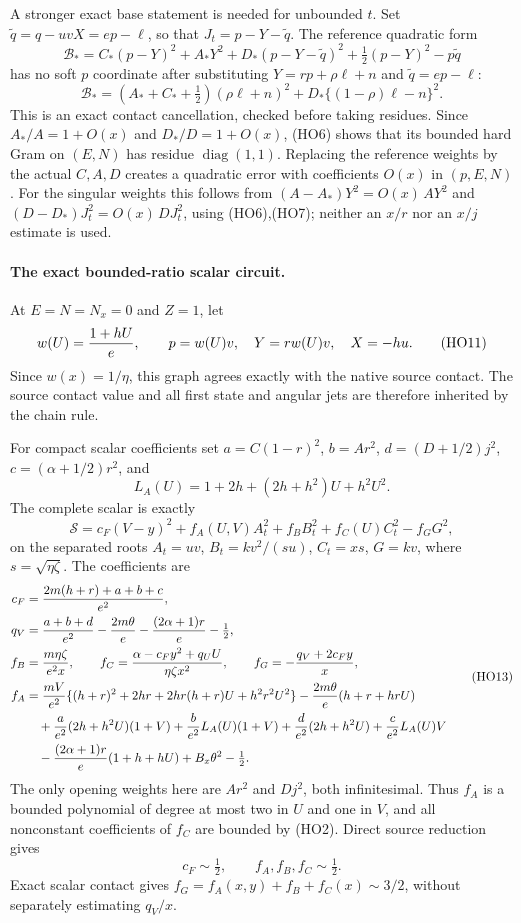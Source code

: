 A stronger exact base statement is needed for unbounded $t$.
Set $\widetilde q=q-uvX=ep-\ell$, so that
$J_t=p-Y-\widetilde q$. The reference quadratic form
\[
 \mathcal B_*=
 C_*(p-Y)^2+A_*Y^2+D_*(p-Y-\widetilde q)^2
                    +\tfrac12(p-Y)^2-p\widetilde q
 \tag{HO9}
\]
has no soft $p$ coordinate after substituting
$Y=rp+\rho\ell+n$ and $\widetilde q=ep-\ell$:
\[
 \mathcal B_*=
 (A_*+C_*+\tfrac12)(\rho\ell+n)^2
                 +D_*\{(1-\rho)\ell-n\}^2 .
 \tag{HO10}
\]
This is an exact contact cancellation, checked before taking residues.
Since $A_*/A=1+O(x)$ and $D_*/D=1+O(x)$, (HO6) shows that
its bounded hard Gram on $(E,N)$ has residue $\operatorname{diag}(1,1)$.
Replacing the reference weights by the actual $C,A,D$ creates a
quadratic error with coefficients $O(x)$ in $(p,E,N)$.
For the singular weights this follows from
$(A-A_*)Y^2=O(x)\,AY^2$ and
$(D-D_*)J_t^2=O(x)\,DJ_t^2$, using (HO6),(HO7);
neither an $x/r$ nor an $x/j$ estimate is used.

\paragraph{The exact bounded-ratio scalar circuit.}
At $E=N=N_x=0$ and $Z=1$, let
\[
 w(U)={1+hU\over e},\qquad
 p=w(U)v,\quad Y=rw(U)v,\quad X=-hu .
 \tag{HO11}
\]
Since $w(x)=1/\eta$, this graph agrees exactly with the native
source contact. The source contact value and all first state and
angular jets are therefore inherited by the chain rule.

For compact scalar coefficients set
$a=C(1-r)^2$, $b=Ar^2$, $d=(D+1/2)j^2$,
$c=(\alpha+1/2)r^2$, and
\[
 L_A(U)=1+2h+(2h+h^2)U+h^2U^2 .
 \]
The complete scalar is exactly
\[
 \mathcal S=c_F(V-y)^2+f_A(U,V)A_t^2+f_BB_t^2+
                         f_C(U)C_t^2-f_GG^2 ,
 \tag{HO12}
\]
on the separated roots
$A_t=uv$, $B_t=kv^2/(su)$, $C_t=xs$, $G=kv$,
where $s=\sqrt{\eta\zeta}$. The coefficients are
\[
 \begin{aligned}
 c_F&={2m(h+r)+a+b+c\over e^2},\\
 q_V&={a+b+d\over e^2}-{2m\theta\over e}
                       -{(2\alpha+1)r\over e}-\tfrac12,\\
 f_B&={m\eta\zeta\over e^2x},\qquad
 f_C={\alpha-c_Fy^2+q_UU\over\eta\zeta x^2},\qquad
 f_G=-{q_V+2c_Fy\over x},\\
 f_A&={mV\over e^2}
 \{(h+r)^2+2hr+2hr(h+r)U+h^2r^2U^2\}
       -{2m\theta\over e}(h+r+hrU)\\
 &\quad+{a\over e^2}(2h+h^2U)(1+V)
       +{b\over e^2}L_A(U)(1+V)
       +{d\over e^2}(2h+h^2U)+{c\over e^2}L_A(U)V\\
 &\quad-{(2\alpha+1)r\over e}(1+h+hU)
                              +B_x\theta^2-\tfrac12 .
 \end{aligned}
 \tag{HO13}
\]
The only opening weights here are $Ar^2$ and $Dj^2$, both
infinitesimal. Thus $f_A$ is a bounded polynomial of degree at most
two in $U$ and one in $V$, and all nonconstant coefficients of
$f_C$ are bounded by (HO2). Direct source reduction gives
\[
 c_F\sim\tfrac12,\qquad f_A,f_B,f_C\sim\tfrac12 .
 \tag{HO14}
\]
Exact scalar contact gives
$f_G=f_A(x,y)+f_B+f_C(x)\sim3/2$, without separately estimating
$q_V/x$.

